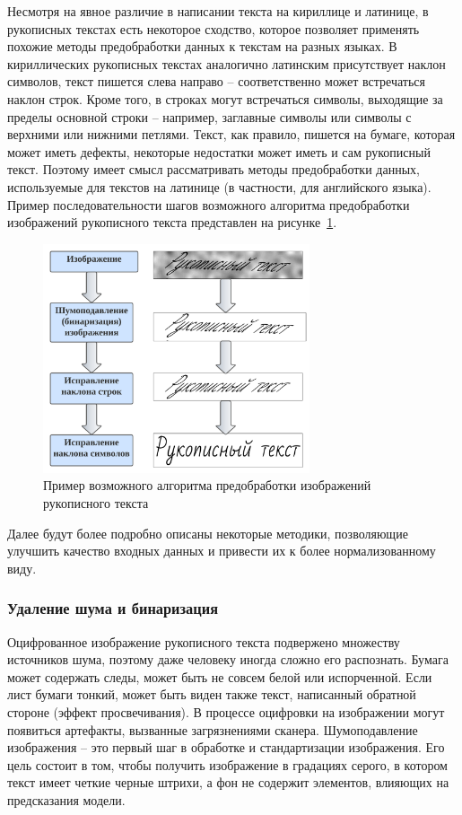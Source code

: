 Несмотря на явное различие в написании текста на кириллице и латинице, в рукописных текстах есть некоторое сходство,
которое позволяет применять похожие методы предобработки данных к текстам на разных языках.
В кириллических рукописных текстах аналогично латинским присутствует наклон символов,
текст пишется слева направо -- соответственно может встречаться наклон строк.
Кроме того, в строках могут встречаться символы, выходящие за пределы основной строки --
например, заглавные символы или символы с верхними или нижними петлями.
Текст, как правило, пишется на бумаге, которая может иметь дефекты, некоторые недостатки может иметь и сам рукописный текст.
Поэтому имеет смысл рассматривать методы предобработки данных, используемые для текстов на латинице (в частности, для английского языка).
Пример последовательности шагов возможного алгоритма предобработки изображений рукописного текста представлен на рисунке~\ref{fig:preprocessing_pipeline}.

\begin{figure}[h!]
    \centering
    \includegraphics[width=0.7\textwidth]{img/preprocessing_pipeline}
    \caption{Пример возможного алгоритма предобработки изображений рукописного текста}
    \label{fig:preprocessing_pipeline}
\end{figure}

Далее будут более подробно описаны некоторые методики, позволяющие улучшить качество входных данных и привести их к более нормализованному виду.

\subsubsection{Удаление шума и бинаризация}
\label{subsubsec:binarization}

Оцифрованное изображение рукописного текста подвержено множеству источников шума, поэтому даже человеку иногда сложно его распознать.
Бумага может содержать следы, может быть не совсем белой или испорченной.
Если лист бумаги тонкий, может быть виден также текст, написанный обратной стороне (эффект просвечивания).
В процессе оцифровки на изображении могут появиться артефакты, вызванные загрязнениями сканера.
Шумоподавление изображения -- это первый шаг в обработке и стандартизации изображения.
Его цель состоит в том, чтобы получить изображение в градациях серого, в котором текст имеет четкие черные штрихи,
а фон не содержит элементов, влияющих на предсказания модели.

